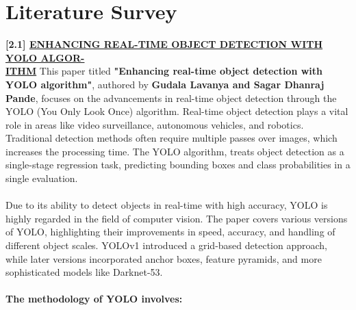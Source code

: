 \chapter{Literature Survey}
%
%
{ \textbf{[2.1] \underline{{ENHANCING REAL-TIME OBJECT DETECTION WITH YOLO ALGOR-}} \\ \underline{ITHM}}}\newline
\newline
%
This paper titled \textbf{"Enhancing real-time object detection with YOLO algorithm"}, authored by \textbf{Gudala Lavanya and Sagar Dhanraj Pande}, focuses on the advancements in real-time object detection through the YOLO (You Only Look Once) algorithm. Real-time object detection plays a vital role in areas like video surveillance, autonomous vehicles, and robotics. Traditional detection methods often require multiple passes over images, which increases the processing time. The YOLO algorithm, treats object detection as a single-stage regression task, predicting bounding boxes and class probabilities in a single evaluation.\\\\
%
Due to its ability to detect objects in real-time with high accuracy, YOLO is highly regarded in the field of computer vision. The paper covers various versions of YOLO, highlighting their improvements in speed, accuracy, and handling of different object scales. YOLOv1 introduced a grid-based detection approach, while later versions incorporated anchor boxes, feature pyramids, and more sophisticated models like Darknet-53.\\\\
%
\textbf{The methodology of YOLO involves:}
